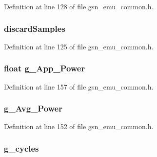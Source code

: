 Definition at line 128 of file gsn\_\-emu\_\-common.h.

\hypertarget{a00066_ac98ccba5b59681756606bf54aa602af4}{
\subsubsection[{discardSamples}]{ {\bf discardSamples}}}
\label{a00066_ac98ccba5b59681756606bf54aa602af4}


Definition at line 125 of file gsn\_\-emu\_\-common.h.

\hypertarget{a00066_af54c058492b0fb464d5b5724360796b5}{
\subsubsection[{g\_\-App\_\-Power}]{\setlength{\rightskip}{0pt plus 5cm}float {\bf g\_\-App\_\-Power}}}
\label{a00066_af54c058492b0fb464d5b5724360796b5}


Definition at line 157 of file gsn\_\-emu\_\-common.h.

\hypertarget{a00066_a22ed65702277f47ccfb2442dfbb8addf}{
\subsubsection[{g\_\-Avg\_\-Power}]{ {\bf g\_\-Avg\_\-Power}}}
\label{a00066_a22ed65702277f47ccfb2442dfbb8addf}


Definition at line 152 of file gsn\_\-emu\_\-common.h.

\hypertarget{a00066_afbbacd7bf47d91e911aa7cae6ccdce28}{
\subsubsection[{g\_\-cycles}]{ {\bf g\_\-cycles}}}
\label{a00066_afbbacd7bf47d91e911aa7cae6ccdce28}


